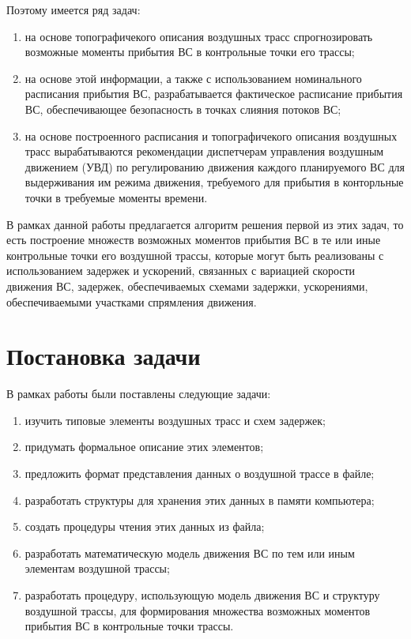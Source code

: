 \documentclass[12pt]{article}
\theoremstyle{plain}
\begin{document}
Поэтому имеется ряд задач:
\begin{enumerate}[topsep=-0.5\parsep,itemsep=-0.5\parsep]
  \item на основе топографичекого описания воздушных трасс спрогнозировать возможные моменты прибытия ВС в контрольные точки его трассы;

  \item на основе этой информации, а также с использованием номинального расписания прибытия ВС, разрабатывается фактическое расписание прибытия ВС, обеспечивающее безопасность в точках слияния потоков ВС;

  \item на основе построенного расписания и топографичекого описания воздушных трасс вырабатываются рекомендации диспетчерам управления воздушным движением (УВД) по регулированию движения каждого планируемого ВС для выдерживания им режима движения, требуемого для прибытия в конторльные точки в требуемые моменты времени.
\end{enumerate}

В рамках данной работы предлагается алгоритм решения первой из этих задач, то есть построение множеств возможных моментов прибытия ВС в те или иные контрольные точки его воздушной трассы, которые могут быть реализованы с использованием задержек и ускорений, связанных с вариацией скорости движения ВС, задержек, обеспечиваемых схемами задержки, ускорениями, обеспечиваемыми участками спрямления движения. 

\section{Постановка задачи}

В рамках работы были поставлены следующие задачи:
\begin{enumerate}[topsep=-0.5\parsep,itemsep=-0.5\parsep]
  \item изучить типовые элементы воздушных трасс и схем задержек; 
  \item придумать формальное описание этих элементов;
  \item предложить формат представления данных о воздушной трассе в файле;
  \item разработать структуры для хранения этих данных в памяти компьютера;
  \item создать процедуры чтения этих данных из файла;
  \item разработать математическую модель движения ВС по тем или иным элементам воздушной трассы;
  \item разработать процедуру, использующую модель движения ВС и структуру воздушной трассы, для формирования множества возможных моментов прибытия ВС в контрольные точки трассы.
\end{enumerate}
\end{document}
